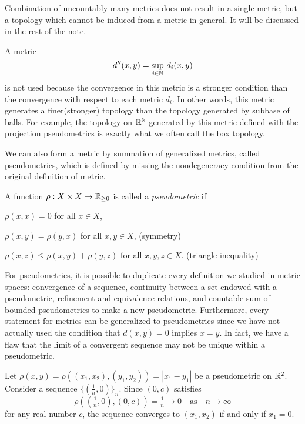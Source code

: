 \documentclass{../../large}
\begin{document}
Combination of uncountably many metrics does not result in a single metric, but a topology which cannot be induced from a metric in general.
It will be discussed in the rest of the note.

\begin{rmk}
A metric
\[d''(x,y)=\sup_{i\in\mathbb{N}}\,d_i(x,y)\]
is not used because the convergence in this metric is a stronger condition than the convergence with respect to each metric $d_i$.
In other words, this metric generates a finer(stronger) topology than the topology generated by subbase of balls.
For example, the topology on $\mathbb{R}^{\mathbb{N}}$ generated by this metric defined with the projection pseudometrics is exactly what we often call the box topology.
\end{rmk}


We can also form a metric by summation of generalized metrics, called pseudometrics, which is defined by missing the nondegeneracy condition from the original definition of metric.

\begin{defn}
A function $\rho:X\times X\to\mathbb{R}_{\ge0}$ is called a \emph{pseudometric} if
\begin{parts}
\item $\rho(x,x)=0$ for all $x\in X$,
\item $\rho(x,y)=\rho(y,x)$ for all $x,y\in X$, \hfill(symmetry)
\item $\rho(x,z)\le \rho(x,y)+\rho(y,z)$ for all $x,y,z\in X$. \hfill(triangle inequality)
\end{parts}
\end{defn}

For pseudometrics, it is possible to duplicate every definition we studied in metric spaces: convergence of a sequence, continuity between a set endowed with a pseudometric, refinement and equivalence relations, and countable sum of bounded pseudometrics to make a new pseudometric.
Furthermore, every statement for metrics can be generalized to pseudometrics since we have not actually used the condition that $d(x,y)=0$ implies $x=y$.
In fact, we have a flaw that the limit of a convergent sequence may not be unique within a pseudometric.

\begin{ex}
Let $\rho(x,y)=\rho((x_1,x_2),(y_1,y_2))=|x_1-y_1|$ be a pseudometric on $\mathbb{R}^2$.
Consider a sequence $\{(\frac1n,0)\}_n$.
Since $(0,c)$ satisfies 
\[\rho((\tfrac1n,0),(0,c))=\tfrac1n\to0\quad\text{as}\quad n\to\infty\]
for any real number $c$, the sequence converges to $(x_1,x_2)$ if and only if $x_1=0$.
\end{ex}
\end{document}
